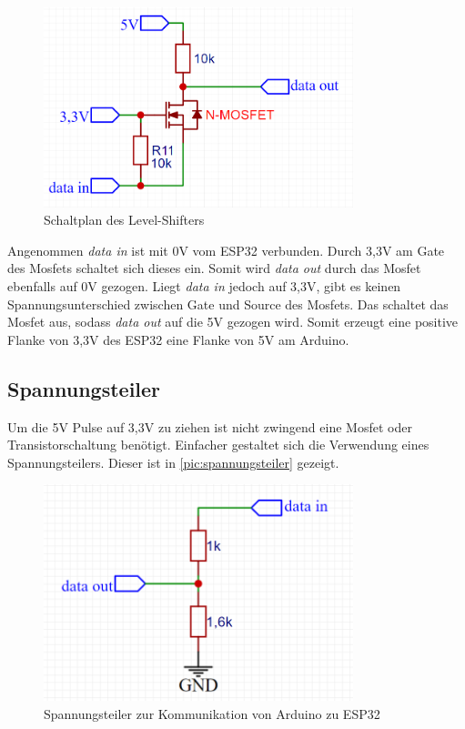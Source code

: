 \begin{figure}[h]
	\begin{center}
		\includegraphics[width=9cm]{levelShifter.PNG}
		\caption{\label{pic:levelshift}Schaltplan des Level-Shifters}
	\end{center}
\end{figure}

Angenommen \textit{data in} ist mit 0V vom ESP32 verbunden. Durch 3,3V am Gate des Mosfets schaltet sich dieses ein. Somit wird \textit{data out} durch das Mosfet ebenfalls auf 0V gezogen. 
Liegt \textit{data in} jedoch auf 3,3V, gibt es keinen Spannungsunterschied zwischen Gate und Source des Mosfets. Das schaltet das Mosfet aus, sodass \textit{data out} auf die 5V gezogen wird. 
Somit erzeugt eine positive Flanke von 3,3V des ESP32 eine Flanke von 5V am Arduino.

\subsection{Spannungsteiler}
Um die 5V Pulse auf 3,3V zu ziehen ist nicht zwingend eine Mosfet oder Transistorschaltung benötigt. Einfacher gestaltet sich die Verwendung eines Spannungsteilers. Dieser ist in \autoref{pic:spannungsteiler} gezeigt.

\begin{figure}[h]
	\begin{center}
		\includegraphics[width=9cm]{spannungsteiler.PNG}
		\caption{\label{pic:spannungsteiler} Spannungsteiler zur Kommunikation von Arduino zu ESP32}
	\end{center}
\end{figure}

